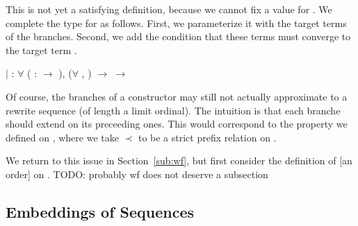 This is not yet a satisfying definition, because we cannot fix a value for
. We complete the type for
 as follows. First, we
parameterize it with the target terms of the branches. Second, we add the
condition that these terms must converge to the target term
.
\begin{singlespace}
\begin{coqdoccode}
\coqdocindent{1.00em}
\ensuremath{|}  :
\ensuremath{\forall}  
( :
\ensuremath{\rightarrow} ),
(\ensuremath{\forall} , 
 ) $\rightarrow$
 
 $\rightarrow$
\coqdoceol
\end{coqdoccode}
\end{singlespace}

Of course, the branches of a 
constructor may still not actually approximate to a rewrite sequence (of
length a limit ordinal). The intuition is that each branche should extend on
its preceeding ones. This would correspond to the
 property we defined on
, where we take $\prec$ to be a
strict prefix relation on
.

We return to this issue in Section~\ref{sub:wf}, but
first consider the definition of [an order] on
.
TODO: probably wf does not deserve a subsection


\subsection{Embeddings of Sequences}

